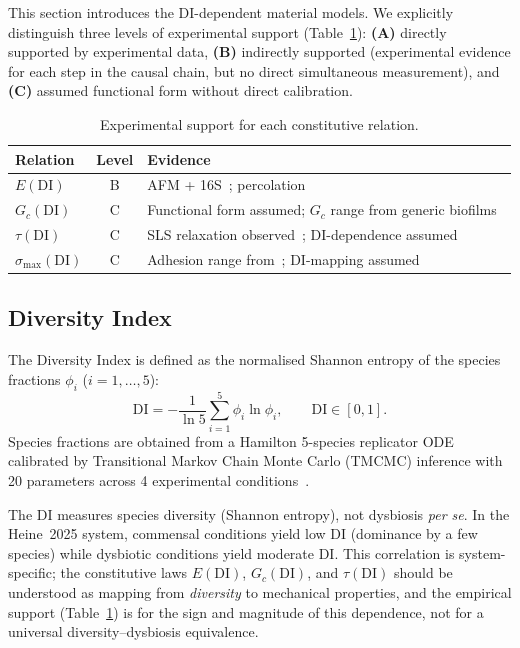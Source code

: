 \documentclass[smallextended]{svjour3}
\newcommand{\DI}{\mathrm{DI}}
\begin{document}
This section introduces the DI-dependent material models.
We explicitly distinguish three levels of experimental support
(Table~\ref{tab:support}): \textbf{(A)} directly supported by
experimental data, \textbf{(B)} indirectly supported (experimental
evidence for each step in the causal chain, but no direct simultaneous
measurement), and \textbf{(C)} assumed functional form without direct
calibration.

\begin{table}[t]
  \centering
  \caption{Experimental support for each constitutive relation.}
  \label{tab:support}
  \begin{tabular}{lcl}
    \toprule
    Relation & Level & Evidence \\
    \midrule
    $E(\DI)$ & B & AFM + 16S~\cite{Pattem2018,Pattem2021};
      percolation~\cite{Sahimi1994} \\
    $G_c(\DI)$ & C & Functional form assumed; $G_c$ range from
      generic biofilms~\cite{Gloag2020a} \\
    $\tau(\DI)$ & C & SLS relaxation observed~\cite{Peterson2015,Stoodley1999};
      DI-dependence assumed \\
    $\sigma_\mathrm{max}(\DI)$ & C & Adhesion range
      from~\cite{Ohashi2009}; DI-mapping assumed \\
    \bottomrule
  \end{tabular}
\end{table}

\subsection{Diversity Index}
\label{sec:const:di}

The Diversity Index is defined as the normalised Shannon entropy of the
species fractions $\phi_i$ ($i = 1, \ldots, 5$):
\begin{equation}
  \DI = -\frac{1}{\ln 5}\sum_{i=1}^{5} \phi_i \ln \phi_i,
  \qquad \DI \in [0, 1].
  \label{eq:DI}
\end{equation}
Species fractions are obtained from a Hamilton 5-species replicator
ODE calibrated by Transitional Markov Chain Monte Carlo
(TMCMC) inference with 20 parameters across 4 experimental
conditions~\cite{Klempt2024,Heine2025}.

\begin{remark}
\label{rem:di}
The DI measures species diversity (Shannon entropy), not dysbiosis
\emph{per se}.
In the Heine~2025 system, commensal conditions yield low DI
(dominance by a few species) while dysbiotic conditions yield
moderate DI.
This correlation is system-specific; the constitutive laws
$E(\DI)$, $G_c(\DI)$, and $\tau(\DI)$ should be understood as mapping
from \emph{diversity} to mechanical properties, and
the empirical support (Table~\ref{tab:support}) is for the sign
and magnitude of this dependence, not for a universal
diversity--dysbiosis equivalence.
\end{remark}
\end{document}
